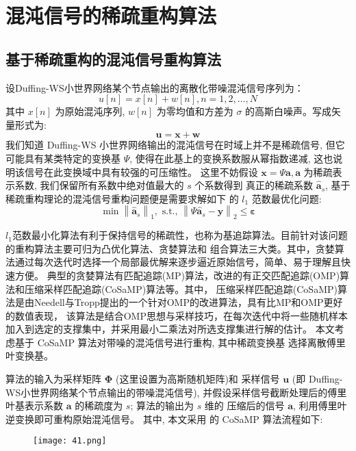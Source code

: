 \chapter{混沌信号的稀疏重构算法}
\section{基于稀疏重构的混沌信号重构算法}
设Duffing-WS小世界网络某个节点输出的离散化带噪混沌信号序列为：
\begin{equation}
    u[n]=x[n]+w[n], n=1,2, \ldots, N
\end{equation}
其中 $x[n]$ 为原始混沌序列, $w[n]$ 为零均值和方差为 $\sigma$ 的高斯白噪声。写成矢量形式为:
\begin{equation}
    \boldsymbol{u}=\boldsymbol{x}+\boldsymbol{w}
\end{equation}
我们知道 Duffing-WS 小世界网络输出的混沌信号在时域上并不是稀疏信号, 
但它可能具有某类特定的变换基 $\Psi$, 使得在此基上的变换系数服从幂指数递减, 
这也说明该信号在此变换域中具有较强的可压缩性。
这里不妨假设 $\boldsymbol{x}=\Psi \boldsymbol{a}, \boldsymbol{a}$ 为稀疏表示系数, 
我们保留所有系数中绝对值最大的 $s$ 个系数得到 真正的稀疏系数 $\hat{\boldsymbol{a}}_s$, 
基于稀疏重构理论的混沌信号重构问题便是需要求解如下 的 $l_1$ 范数最优化问题:
\begin{equation}
    \min \left\|\hat{\boldsymbol{a}}_s\right\|_1, \text { s.t., }\left\|\Psi \hat{\boldsymbol{a}}_s-\boldsymbol{y}\right\|_2 \leq \boldsymbol{\varepsilon}
\end{equation}\par
$l_1$范数最小化算法有利于保持信号的稀疏性，也称为基追踪算法。目前针对该问题的重构算法主要可归为凸优化算法、贪婪算法和
组合算法三大类。其中，贪婪算法通过每次迭代时选择一个局部最优解来逐步逼近原始信号，简单、易于理解且快速方便。
典型的贪婪算法有匹配追踪(MP)算法，改进的有正交匹配追踪(OMP)算法和压缩采样匹配追踪(CoSaMP)算法等。其中，
压缩采样匹配追踪(CoSaMP)算法是由Needell与Tropp提出的一个针对OMP的改进算法，具有比MP和OMP更好的数值表现，
该算法是结合OMP思想与采样技巧，在每次迭代中将一些随机样本加入到选定的支撑集中，并采用最小二乘法对所选支撑集进行解的估计。
本文考虑基于 CoSaMP 算法对带噪的混沌信号进行重构, 其中稀疏变换基 选择离散傅里叶变换基。\par
算法的输入为采样矩阵 $\boldsymbol{\Phi}$ (这里设置为高斯随机矩阵)和 采样信号 $\boldsymbol{u}$ 
(即 Duffing-WS小世界网络某个节点输出的带噪混沌信号), 并假设采样信号截断处理后的傅里叶基表示系数 $\boldsymbol{a}$ 
的稀疏度为 $s$; 算法的输出为 $s$ 维的 压缩后的信号 $\boldsymbol{a}$, 利用傅里叶逆变换即可重构原始混沌信号。
其中, 本文采用 的 CoSaMP 算法流程如下:
\begin{figure}[!htbp]
    \centering
    \texttt{[image: 41.png]}
\end{figure}
